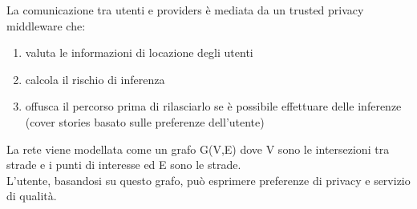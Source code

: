 La comunicazione tra utenti e providers è mediata da un trusted privacy middleware che:
\begin{enumerate}
    \item valuta le informazioni di locazione degli utenti
    \item calcola il rischio di inferenza
    \item offusca il percorso prima di rilasciarlo se è possibile effettuare delle inferenze (cover stories basato sulle preferenze dell'utente)
\end{enumerate}
La rete viene modellata come un grafo G(V,E) dove V sono le intersezioni tra strade e i punti di interesse ed E sono le strade. \\L'utente, basandosi su questo grafo, può esprimere preferenze di privacy e servizio di qualità.
